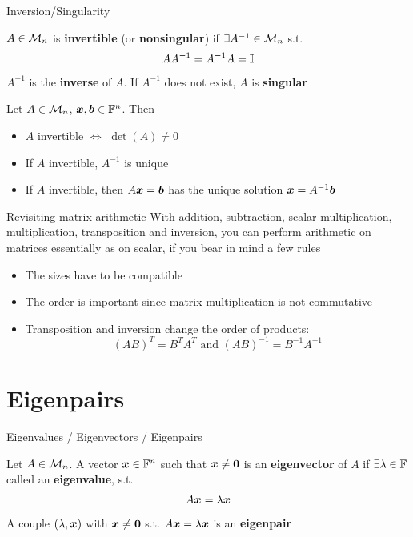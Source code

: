 \documentclass[aspectratio=169]{beamer}\usepackage[]{graphicx}\usepackage[]{xcolor}
\begin{document}
\begin{frame}{Inversion/Singularity}
\begin{definition}
$A\in\mathcal{M}_n$ is \textbf{invertible} (or \textbf{nonsingular}) if $\exists A^{-1}\in\mathcal{M}_n$ s.t.
\[
AA^{-1}=A^{-1}A=\mathbb{I}
\]
$A^{-1}$ is the \textbf{inverse} of $A$. If $A^{-1}$ does not exist, $A$ is \textbf{singular}
\end{definition}
\begin{importanttheorem}
Let $A\in\mathcal{M}_n$, $\bm{x},\bm{b}\in\mathbb{F}^n$. Then
\begin{itemize}
	\item $A$ invertible $\iff$ $\det(A)\neq 0$
	\item If $A$ invertible, $A^{-1}$ is unique
	\item If $A$ invertible, then $A\bm{x}=\bm{b}$ has the unique solution $\bm{x}=A^{-1}\bm{b}$
\end{itemize}
\end{importanttheorem}
\end{frame}

\begin{frame}{Revisiting matrix arithmetic}
With addition, subtraction, scalar multiplication, multiplication, transposition and inversion, you can perform arithmetic on matrices essentially as on scalar, if you bear in mind a few rules
\begin{itemize}
\item The sizes have to be compatible
\item The order is important since matrix multiplication is not commutative
\item Transposition and inversion change the order of products:
\[
(AB)^T=B^TA^T\textrm{ and }(AB)^{-1}=B^{-1}A^{-1}
\]
\end{itemize}
\end{frame}


\section{Eigenpairs}

\begin{frame}{Eigenvalues / Eigenvectors / Eigenpairs}
\begin{definition}
Let $A\in\mathcal{M}_n$. A vector $\bm{x}\in\mathbb{F}^n$ such that $\bx\neq\b0$ is an \textbf{eigenvector} of $A$ if $\exists\lambda\in\mathbb{F}$ called an \textbf{eigenvalue}, s.t.
\[
A\bm{x}=\lambda \bm{x}
\]
A couple $(\lambda,\bm{x})$ with $\bx\neq\b0$ s.t. $A\bm{x}=\lambda\bm{x}$ is an \textbf{eigenpair}
\end{definition}
\end{frame}
\end{document}
